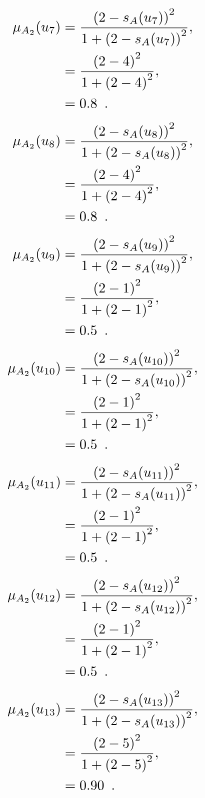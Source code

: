 \documentclass[a4paper,openany]{book}
\begin{document}
				\begin{align}
					\mu_{A_2}(u_7) &= \frac{\left(2-s_A(u_7)\right)^2}{1 + \left(2-s_A(u_7)\right)^2} ,\\
					&= \frac{\left(2-4\right)^2}{1 + \left(2-4\right)^2} \notag ,\\
					&= 0.8 \enspace. \notag
				\end{align}
				\begin{align}
					\mu_{A_2}(u_8) &= \frac{\left(2-s_A(u_8)\right)^2}{1 + \left(2-s_A(u_8)\right)^2} ,\\
					&= \frac{\left(2-4\right)^2}{1 + \left(2-4\right)^2} \notag ,\\
					&= 0.8 \enspace. \notag
				\end{align}
				\begin{align}
					\mu_{A_2}(u_9) &= \frac{\left(2-s_A(u_9)\right)^2}{1 + \left(2-s_A(u_9)\right)^2} ,\\
					&= \frac{\left(2-1\right)^2}{1 + \left(2-1\right)^2} \notag ,\\
					&= 0.5 \enspace. \notag
				\end{align}
				\begin{align}
					\mu_{A_2}(u_{10}) &= \frac{\left(2-s_A(u_{10})\right)^2}{1 + \left(2-s_A(u_{10})\right)^2} ,\\
					&= \frac{\left(2-1\right)^2}{1 + \left(2-1\right)^2} \notag ,\\
					&= 0.5 \enspace. \notag
				\end{align}
				\begin{align}
					\mu_{A_2}(u_{11}) &= \frac{\left(2-s_A(u_{11})\right)^2}{1 + \left(2-s_A(u_{11})\right)^2} ,\\
					&= \frac{\left(2-1\right)^2}{1 + \left(2-1\right)^2} \notag ,\\
					&= 0.5 \enspace. \notag
				\end{align}
				\begin{align}
					\mu_{A_2}(u_{12}) &= \frac{\left(2-s_A(u_{12})\right)^2}{1 + \left(2-s_A(u_{12})\right)^2} ,\\
					&= \frac{\left(2-1\right)^2}{1 + \left(2-1\right)^2} \notag ,\\
					&= 0.5 \enspace. \notag
				\end{align}
				\begin{align}
					\mu_{A_2}(u_{13}) &= \frac{\left(2-s_A(u_{13})\right)^2}{1 + \left(2-s_A(u_{13})\right)^2} ,\\
					&= \frac{\left(2-5\right)^2}{1 + \left(2-5\right)^2} \notag ,\\
					&= 0.90 \enspace. \notag
				\end{align}
\end{document}
